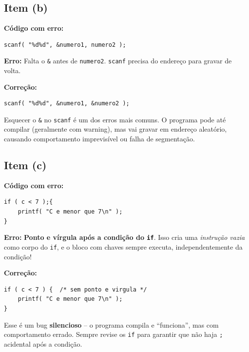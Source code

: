\documentclass[12pt,a4paper]{article}
\begin{document}
\subsection*{Item (b)}
\begin{respostabox}
\textbf{Código com erro:}
\begin{lstlisting}
scanf( "%d%d", &numero1, numero2 );
\end{lstlisting}

\textbf{Erro:} Falta o \texttt{\&} antes de \texttt{numero2}. \texttt{scanf} precisa
do endereço para gravar de volta.

\textbf{Correção:}
\begin{lstlisting}
scanf( "%d%d", &numero1, &numero2 );
\end{lstlisting}

\begin{erroco}
  Esquecer o \texttt{\&} no \texttt{scanf} é um dos erros mais comuns. O programa
  pode até compilar (geralmente com warning), mas vai gravar em endereço aleatório,
  causando comportamento imprevisível ou falha de segmentação.
\end{erroco}
\end{respostabox}

\subsection*{Item (c)}
\begin{respostabox}
\textbf{Código com erro:}
\begin{lstlisting}
if ( c < 7 );{
    printf( "C e menor que 7\n" );
}
\end{lstlisting}

\textbf{Erro:} \textbf{Ponto e vírgula após a condição do \texttt{if}}. Isso cria
uma \textit{instrução vazia} como corpo do \texttt{if}, e o bloco com chaves
sempre executa, independentemente da condição!

\textbf{Correção:}
\begin{lstlisting}
if ( c < 7 ) {  /* sem ponto e virgula */
    printf( "C e menor que 7\n" );
}
\end{lstlisting}

\begin{erroco}
  Esse é um bug \textbf{silencioso} -- o programa compila e ``funciona'', mas com
  comportamento errado. Sempre revise os \texttt{if} para garantir que não haja
  \texttt{;} acidental após a condição.
\end{erroco}
\end{respostabox}
\end{document}
